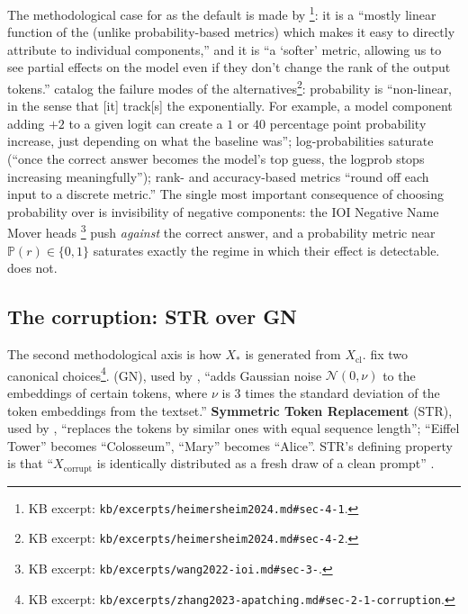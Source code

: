 The methodological case for  as the default is made by
\citet[\S 4.1]{heimersheim2024-apatching-howto}\footnote{KB excerpt:
\texttt{kb/excerpts/heimersheim2024.md\#sec-4-1}.}: it is a
``mostly linear function of the  (unlike
probability-based metrics) which makes it easy to directly attribute
 to individual components,'' and it is ``a `softer'
metric, allowing us to see partial effects on the model even if they
don't change the rank of the output tokens.''
\citet[\S 4.2]{heimersheim2024-apatching-howto} catalog the failure
modes of the alternatives\footnote{KB excerpt:
\texttt{kb/excerpts/heimersheim2024.md\#sec-4-2}.}: probability is
``non-linear, in the sense that [it] track[s] the  exponentially.
For example, a model component adding $+2$ to a given logit can create
a $1$ or $40$ percentage point probability increase, just depending on
what the baseline was''; log-probabilities saturate (``once the correct
answer becomes the model's top guess, the logprob stops increasing
meaningfully''); rank- and accuracy-based metrics ``round off each
input to a discrete metric.'' The single most important consequence of
choosing probability over  is invisibility of negative
components: the IOI Negative Name Mover heads
\citep[\S 3]{wang2022-ioi}\footnote{KB excerpt:
\texttt{kb/excerpts/wang2022-ioi.md\#sec-3-}.} push \emph{against}
the correct answer, and a probability metric near $\mathbb{P}(r) \in
\{0, 1\}$ saturates exactly the regime in which their effect is
detectable.  does not.

\subsection{The corruption: STR over GN}
\label{sec:patching-corruption}

The second methodological axis is how $X_{*}$ is generated from
$X_{\text{cl}}$. \citet[\S 2.1]{zhang2023-apatching} fix two
canonical choices\footnote{KB excerpt:
\texttt{kb/excerpts/zhang2023-apatching.md\#sec-2-1-corruption}.}.
\textbf{} (GN), used by \citet{meng2022-rome}, ``adds
Gaussian noise $\mathcal{N}(0, \nu)$ to the embeddings of certain 
tokens, where $\nu$ is 3 times the standard deviation of the token
embeddings from the textset.'' \textbf{Symmetric Token Replacement}
(STR), used by \citet{wang2022-ioi}, ``replaces the  tokens by
similar ones with equal sequence length''; ``Eiffel Tower'' becomes
``Colosseum'', ``Mary'' becomes ``Alice''. STR's defining property is
that ``$X_{\mathrm{corrupt}}$ is identically distributed as a fresh
draw of a clean prompt'' \citep[\S 2.1]{zhang2023-apatching}.

